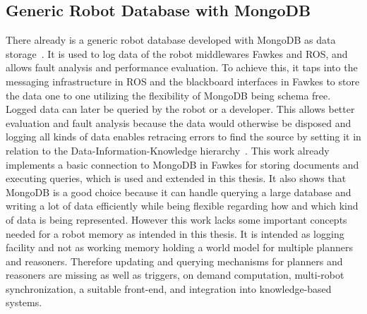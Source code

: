 \subsection{Generic Robot Database with MongoDB}
\label{sec:mongo-logging}
There already is a generic robot database developed with MongoDB as
data storage~\cite{RoboDB}. It is used to log data of the robot
middlewares Fawkes and ROS, and allows fault analysis and performance
evaluation. To achieve this, it taps into the messaging infrastructure
in ROS and the blackboard interfaces in Fawkes to store the data one
to one utilizing the flexibility of MongoDB being schema
free. Logged data can later be queried by the robot or a
developer. This allows better evaluation and fault analysis because
the data would otherwise be disposed and logging all kinds of data enables
retracing errors to find the source by setting it in relation to the 
Data-Information-Knowledge hierarchy~\cite{DIKW}. This work already
implements a basic connection to MongoDB in Fawkes for storing
documents and executing queries, which is used and extended in
this thesis. It also shows that MongoDB is a good choice because it
can handle querying a large database and writing a lot of data
efficiently while being flexible regarding how and which kind of data
is being represented.  However this work lacks some important concepts
needed for a robot memory as intended in this thesis. It is intended
as logging facility and not as working memory holding a world model
for multiple planners and reasoners. Therefore updating and querying
mechanisms for planners and reasoners are missing as well as triggers,
on demand computation, multi-robot synchronization, a
suitable front-end, and integration into knowledge-based systems.

